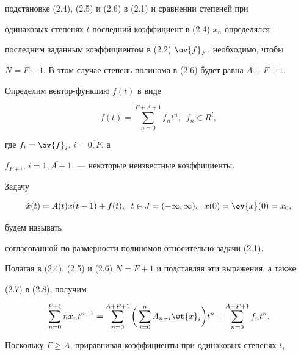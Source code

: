подстановке (2.4), (2.5) и (2.6) в (2.1) и сравнении степеней при


одинаковых степенях $t$ последний коэффициент в (2.4) $x_{n}$ определялся


последним заданным коэффициентом в (2.2) $\ov{f}_{F}$, необходимо, чтобы


$N=F+1$. В этом случае степень полинома в (2.6) будет равна $A+F+1$.





Определим вектор-функцию $f(t)$  в виде


\begin{equation}


f(t)=\sum_{n=0}^{F+A+1}f_{n}t^{n},\ \;f_{n} \in R^{l},


\end{equation}


где $f_{i}=\ov{f}_{i}$, $i=\overline{0,F}$, а


$f_{F+i}$, $i=\overline{1,A+1}$, --- некоторые неизвестные коэффициенты.





\begin{defns} Задачу


\begin{equation}


\Dot{x}(t)=A(t)x(t-1)+f(t),\ \; t\in J=(-\infty,\infty),\ \;


x(0)=\ov{x}(0)=x_{0},


\end{equation}


будем называть


согласованной по размерности полиномов относительно задачи (2.1).


\end{defns}





Полагая в (2.4), (2.5) и (2.6) $N=F+1$ и подставляя эти выражения, а также


(2.7) в (2.8), получим


$$


\sum_{n=0}^{F+1}nx_{n}t^{n-1}=\sum_{n=0}^{A+F+1}\bigg(\sum_{i=0}^{n}A_{n-i}


\wt{x}_{i}\bigg)t^{n}+\sum_{n=0}^{A+F+1}f_{n}t^{n}.


$$


Поскольку $F\geq A$, приравнивая коэффициенты при одинаковых степенях $t$,


